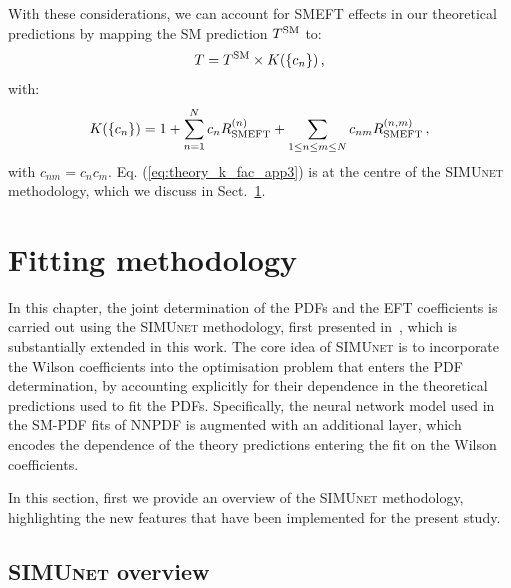 \documentclass[withindex,glossary]{cam-thesis}
\newcommand{\simunet}{\textsc{SIMUnet}}
\begin{document}
With these considerations, we can account for SMEFT effects in our theoretical predictions
by mapping the SM prediction $T^{\rm SM}$ to:
%
\begin{equation}
\label{eq:theory_k_fac_app3}
 T = T^{\rm SM} \times  K(\{c_n\})\, , 
\end{equation}
%
with:
%
\begin{equation}
\label{eq:theory_k_fac}
    K(\{c_n\}) = 1+\sum_{n=1}^{N} c_n R_{\rm SMEFT}^{(n)}
    +\sum_{1 \leq n \leq m \leq N} c_{nm} R_{\rm SMEFT}^{(n,m)} \, ,
\end{equation}
%
with $c_{nm} = c_n c_m$. Eq. (\ref{eq:theory_k_fac_app3}) is at the centre of the \simunet{} methodology, which we discuss in Sect.~\ref{sec:simunet_methodology}. 


\section{Fitting methodology}
\label{sec:simunet_methodology}

In this chapter, the joint determination of the PDFs and the EFT coefficients is
carried out using the \simunet{} methodology, first presented
in~\cite{Iranipour:2022iak}, which is substantially extended in this work.
%
The core idea of  \simunet{}  is to incorporate the Wilson coefficients into the optimisation problem
that enters the PDF determination, by accounting explicitly for their dependence
in the theoretical predictions used to fit the PDFs.
%
Specifically, the neural network model used in the SM-PDF fits of NNPDF is
augmented with an additional layer, which encodes the dependence of the theory
predictions entering the fit on the Wilson coefficients.

In this section, first we provide an overview of the \simunet{}
methodology, highlighting the new features that have been implemented
for the present study.
%

\subsection{\simunet{} overview}
\label{sec:simunet}
\end{document}
